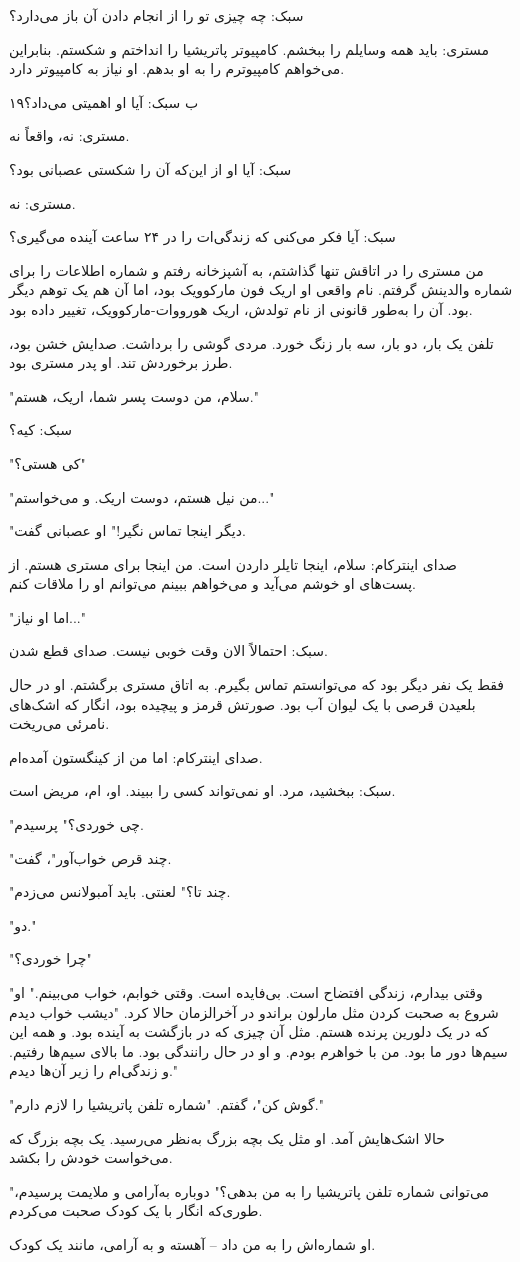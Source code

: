 \- سبک: چه چیزی تو را از انجام دادن آن باز می‌دارد؟

\- مستری: باید همه وسایلم را ببخشم. کامپیوتر پاتریشیا را انداختم و شکستم. بنابراین می‌خواهم کامپیوترم را به او بدهم. او نیاز به کامپیوتر دارد.

۱۹ب  
\- سبک: آیا او اهمیتی می‌داد؟

\- مستری: نه، واقعاً نه.

\- سبک: آیا او از این‌که آن را شکستی عصبانی بود؟

\- مستری: نه.

\- سبک: آیا فکر می‌کنی که زندگی‌ات را در ۲۴ ساعت آینده می‌گیری؟

من مستری را در اتاقش تنها گذاشتم، به آشپزخانه رفتم و شماره اطلاعات را برای شماره والدینش گرفتم. نام واقعی او اریک فون مارکوویک بود، اما آن هم یک توهم دیگر بود. آن را به‌طور قانونی از نام تولدش، اریک هورووات-مارکوویک، تغییر داده بود.

تلفن یک بار، دو بار، سه بار زنگ خورد. مردی گوشی را برداشت. صدایش خشن بود، طرز برخوردش تند. او پدر مستری بود.


"سلام، من دوست پسر شما، اریک، هستم."

\- سبک: کیه؟

"کی هستی؟"

\- "من نیل هستم، دوست اریک. و می‌خواستم..."

"دیگر اینجا تماس نگیر!" او عصبانی گفت.

\- صدای اینترکام: سلام، اینجا تایلر داردن است. من اینجا برای مستری هستم. از پست‌های او خوشم می‌آید و می‌خواهم ببینم می‌توانم او را ملاقات کنم.

"اما او نیاز..."

\- سبک: احتمالاً الان وقت خوبی نیست. صدای قطع شدن.

فقط یک نفر دیگر بود که می‌توانستم تماس بگیرم. به اتاق مستری برگشتم. او در حال بلعیدن قرصی با یک لیوان آب بود. صورتش قرمز و پیچیده بود، انگار که اشک‌های نامرئی می‌ریخت.

\- صدای اینترکام: اما من از کینگستون آمده‌ام.

\- سبک: ببخشید، مرد. او نمی‌تواند کسی را ببیند. او، ام، مریض است.

"چی خوردی؟" پرسیدم.

"چند قرص خواب‌آور"، گفت.

"چند تا؟" لعنتی. باید آمبولانس می‌زدم.

"دو."

"چرا خوردی؟"

"وقتی بیدارم، زندگی افتضاح است. بی‌فایده است. وقتی خوابم، خواب می‌بینم." او شروع به صحبت کردن مثل مارلون براندو در آخرالزمان حالا کرد. "دیشب خواب دیدم که در یک دلورین پرنده هستم. مثل آن چیزی که در بازگشت به آینده بود. و همه این سیم‌ها دور ما بود. من با خواهرم بودم. و او در حال رانندگی بود. ما بالای سیم‌ها رفتیم. و زندگی‌ام را زیر آن‌ها دیدم."

"گوش کن"، گفتم. "شماره تلفن پاتریشیا را لازم دارم."

حالا اشک‌هایش آمد. او مثل یک بچه بزرگ به‌نظر می‌رسید. یک بچه بزرگ که می‌خواست خودش را بکشد.

"می‌توانی شماره تلفن پاتریشیا را به من بدهی؟" دوباره به‌آرامی و ملایمت پرسیدم، طوری‌که انگار با یک کودک صحبت می‌کردم.

او شماره‌اش را به من داد – آهسته و به آرامی، مانند یک کودک.